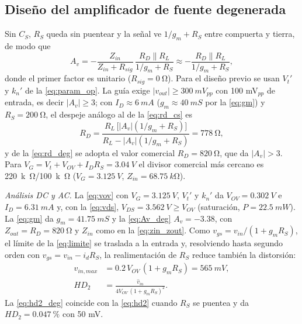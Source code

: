 \documentclass[conference]{IEEEtran}
\newcommand{\gm}{g_m}
\newcommand{\Vov}{V_{OV}}
\newcommand{\Vtp}{V_t'}
\newcommand{\knp}{k_n'}
\newcommand{\Rsig}{R_{sig}}
\begin{document}
\subsection{Diseño del amplificador de fuente degenerada}
Sin $C_S$, $R_S$ queda sin puentear y la señal ve $1/\gm+R_S$ entre compuerta y tierra, de modo que
\begin{equation}
A_v=-\frac{Z_{in}}{Z_{in}+\Rsig}\,\frac{R_D\parallel R_L}{1/\gm+R_S}
\approx-\frac{R_D\parallel R_L}{1/\gm+R_S},
\label{eq:Av_deg}
\end{equation}
donde el primer factor es unitario ($\Rsig=\SI{0}{\ohm}$). Para el diseño previo se usan $\Vtp$ y $\knp$ de la \eqref{eq:param_op}. La guía exige $|v_{out}|\ge\SI{300}{mV_{pp}}$ con 100 mV$_{pp}$ de entrada, es decir $|A_v|\ge 3$; con $I_D\approx\SI{6}{mA}$ ($\gm\approx\SI{40}{mS}$ por la \eqref{eq:gm}) y $R_S=\SI{200}{\ohm}$, el despeje análogo al de la \eqref{eq:rd_cs} es
\begin{equation}
R_D=\frac{R_L\,\bigl[|A_v|(1/\gm+R_S)\bigr]}{R_L-|A_v|(1/\gm+R_S)}=\SI{778}{\ohm},
\label{eq:rd_deg}
\end{equation}
y de la \eqref{eq:rd_deg} se adopta el valor comercial $R_D=\SI{820}{\ohm}$, que da $|A_v|>3$. Para $V_G=V_t+\Vov+I_DR_S=\SI{3.04}{V}$ el divisor comercial más cercano es \SI{220}{k\ohm}/\SI{100}{k\ohm} ($V_G=\SI{3.125}{V}$, $Z_{in}=\SI{68.75}{k\ohm}$).

\noindent\textit{Análisis DC y AC.} La \eqref{eq:vov} con $V_G=\SI{3.125}{V}$, $\Vtp$ y $\knp$ da $\Vov=\SI{0.302}{V}$ e $I_D=\SI{6.31}{mA}$ y, con la \eqref{eq:vds}, $V_{DS}=\SI{3.562}{V}\ge\Vov$ (saturación, $P=\SI{22.5}{mW}$). La \eqref{eq:gm} da $\gm=\SI{41.75}{mS}$ y la \eqref{eq:Av_deg} $A_v=-3.38$, con $Z_{out}=R_D=\SI{820}{\ohm}$ y $Z_{in}$ como en la \eqref{eq:zin_zout}. Como $v_{gs}=v_{in}/(1+\gm R_S)$, el límite de la \eqref{eq:limite} se traslada a la entrada y, resolviendo hasta segundo orden con $v_{gs}=v_{in}-i_dR_S$, la realimentación de $R_S$ reduce también la distorsión:
\begin{align}
\hat v_{in,max}&=0.2\,\Vov\,(1+\gm R_S)=\SI{565}{mV},\label{eq:limite_deg}\\
HD_2&=\frac{\hat v_{in}}{4\Vov\,(1+\gm R_S)^2}.\label{eq:hd2_deg}
\end{align}
La \eqref{eq:hd2_deg} coincide con la \eqref{eq:hd2} cuando $R_S$ se puentea y da $HD_2=\SI{0.047}{\percent}$ con 50 mV.
\end{document}
